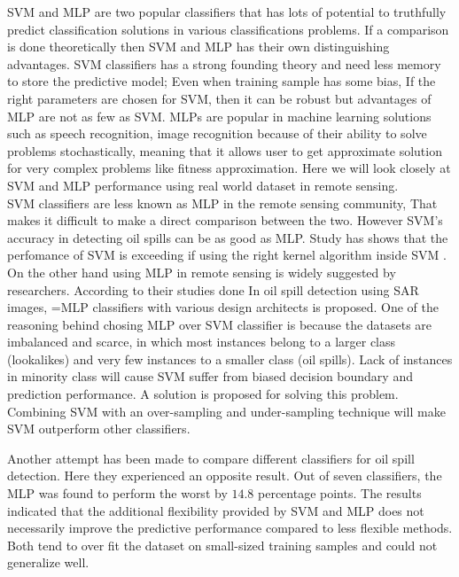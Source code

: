 

SVM and MLP are two popular classifiers that has lots of potential to truthfully predict classification solutions in various classifications problems\cite{Moavenian20103088,Zanaty2012177}. If a comparison is done theoretically then SVM and MLP has their own distinguishing advantages. SVM classifiers has a strong founding theory and need less memory to store the predictive model; Even when training sample has some bias, If the right parameters are chosen for SVM, then it can be robust\cite{auria2008support} but advantages of MLP are not as few as SVM. MLPs are popular in machine learning solutions such as speech recognition, image recognition because of their ability to solve problems stochastically, meaning that it allows user to get approximate solution for very complex problems like fitness approximation\cite{jin2005neural}. Here we will look closely at SVM and MLP performance using real world dataset in remote sensing.\\

SVM classifiers are less known as MLP in the remote sensing community, That makes it difficult to make a direct comparison between the two. However SVM's accuracy in detecting oil spills can be as good as MLP. Study has shows that the perfomance of SVM is exceeding if using the right kernel algorithm inside SVM \cite{liu2006boosting}. On the other hand using MLP in remote sensing is widely suggested by researchers\cite{Mera201472,Brekke200595,fingas2014review}. According to their studies done In oil spill detection using SAR images, =MLP classifiers with various design architects is proposed. One of the reasoning behind chosing MLP over SVM classifier is because the datasets are imbalanced and scarce, in which most instances belong to a larger class (lookalikes) and very few instances to a smaller class (oil spills). Lack of instances in minority class will cause SVM suffer from biased decision boundary and prediction performance. A solution is proposed for solving this problem. Combining SVM with an over-sampling and under-sampling technique will make SVM outperform other classifiers\cite{liu2006boosting}.


Another attempt has been made to compare different classifiers for oil spill detection.\cite{Xu201414} Here they experienced an opposite result. Out of seven classifiers, the MLP was found to perform the worst by $14.8$ percentage points. The results indicated that the additional flexibility provided by SVM and MLP does not necessarily improve the predictive performance compared to less flexible methods. Both tend to over fit the dataset on small-sized training samples and could not generalize well. 

